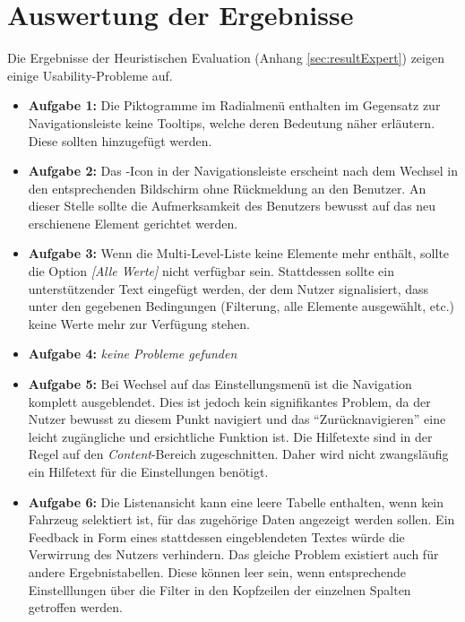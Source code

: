 \section{Auswertung der Ergebnisse} \label{sec:analysisConclusion}
Die Ergebnisse der Heuristischen Evaluation (Anhang \ref{sec:resultExpert}) zeigen einige Usability-Probleme auf.\par
\begin{itemize}
 \item \textbf{Aufgabe 1:} Die Piktogramme im Radialmenü enthalten im Gegensatz zur Navigationsleiste keine Tooltips, welche deren Bedeutung näher erläutern. Diese sollten hinzugefügt werden.
 \item \textbf{Aufgabe 2:} Das -Icon in der Navigationsleiste erscheint nach dem Wechsel in den entsprechenden Bildschirm ohne Rückmeldung an den Benutzer. An dieser Stelle sollte die Aufmerksamkeit des Benutzers bewusst auf das neu erschienene Element gerichtet werden.
 \item \textbf{Aufgabe 3:} Wenn die Multi-Level-Liste keine Elemente mehr enthält, sollte die Option \textit{[Alle Werte]} nicht verfügbar sein. Stattdessen sollte ein unterstützender Text eingefügt werden, der dem Nutzer signalisiert, dass unter den gegebenen Bedingungen (Filterung, alle Elemente ausgewählt, etc.) keine Werte mehr zur Verfügung stehen.
 \item \textbf{Aufgabe 4:} \textit{keine Probleme gefunden}
 \item \textbf{Aufgabe 5:} Bei Wechsel auf das Einstellungsmenü ist die Navigation komplett ausgeblendet. Dies ist jedoch kein signifikantes Problem, da der Nutzer bewusst zu diesem Punkt navigiert und das \enquote{Zurücknavigieren} eine leicht zugängliche und ersichtliche Funktion ist. Die Hilfetexte sind in der Regel auf den \textit{Content}-Bereich zugeschnitten. Daher wird nicht zwangsläufig ein Hilfetext für die Einstellungen benötigt.
 \item \textbf{Aufgabe 6:} Die Listenansicht kann eine leere Tabelle enthalten, wenn kein Fahrzeug selektiert ist, für das zugehörige Daten angezeigt werden sollen. Ein Feedback in Form eines stattdessen eingeblendeten Textes würde die Verwirrung des Nutzers verhindern. Das gleiche Problem existiert auch für andere Ergebnistabellen. Diese können leer sein, wenn entsprechende Einstelllungen über die Filter in den Kopfzeilen der einzelnen Spalten getroffen werden.
\end{itemize}
